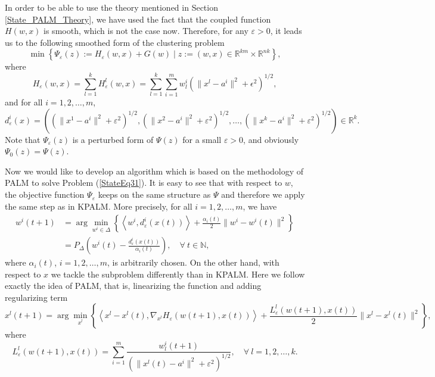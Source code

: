 \documentclass[11pt]{article}
\numberwithin{equation}{section}
\begin{document}
In order to be able to use the theory mentioned in Section \ref{State_PALM_Theory}, we have used the fact that the coupled function $H(w,x)$ is smooth, which is not the case now. Therefore, for any $\varepsilon > 0$, it leads us to the following smoothed form of the clustering problem
\begin{equation}
	\min \left\lbrace \Psi_{\varepsilon}(z) := H_{\varepsilon}(w,x) + G(w) \mid z := (w,x) \in \mathbb{R}^{km} \times \mathbb{R}^{nk} \right\rbrace , \label{StateEq31}
\end{equation}
where 
\begin{equation}
	H_{\varepsilon}(w,x) = \sum\limits_{l=1}^{k} H^l_{\varepsilon}(w,x)
	= \sum\limits_{l=1}^{k} \sum\limits_{i=1}^{m} w^i_l \left( \| x^l - a^i \|^2 + {\epsilon}^2 \right)^{1/2} , \label{StateEq34}
\end{equation}
and for all $i=1,2, \ldots, m$,
\begin{equation*}
	d_{\varepsilon}^i(x) = \left( \left( \|x^1 - a^i\|^2 + {\varepsilon}^2 \right)^{1/2}, \left( \|x^2 - a^i\|^2 + {\varepsilon}^2 \right)^{1/2}, \ldots , \left( \|x^k - a^i\|^2 + {\varepsilon}^2 \right)^{1/2} \right) \in \mathbb{R}^k .
\end{equation*}
Note that $\Psi_{\varepsilon}(z)$ is a perturbed form of $\Psi(z)$ for a small $\varepsilon > 0$, and obviously $\Psi_0(z)=\Psi(z)$.

Now we would like to develop an algorithm which is based on the methodology of PALM to solve Problem (\ref{StateEq31}). It is easy to see that with respect to $w$, the objective function $\Psi_{\varepsilon}$ keeps on the same structure as $\Psi$ and therefore we apply the same step as in KPALM. More precisely, for all $i=1,2, \ldots, m$, we have
\begin{align*}
	w^i(t+1) &= \arg\!\min\limits_{w^i \in \Delta} \left\lbrace \left\langle w^i, d^i_{\varepsilon}(x(t)) \right\rangle + \frac{\alpha_i(t)}{2} \|w^i -w^i(t)\|^2 \right\rbrace \\
	&= P_{\Delta} \left( w^i(t) - \frac{d^i_{\varepsilon}(x(t))}{\alpha_i(t)} \right), \quad \forall \: t \in \mathbb{N},
\end{align*}
where $\alpha_i(t)$, $i=1,2, \ldots, m$, is arbitrarily chosen. On the other hand, with respect to $x$ we tackle the subproblem differently than in KPALM. Here we follow exactly the idea of PALM, that is, linearizing the function and adding regularizing term
\begin{equation*}
	x^l(t+1) = \arg\!\min\limits_{x^l} \left\lbrace \left\langle x^l - x^l(t) , \nabla_{x^l}H_{\varepsilon}(w(t+1),x(t)) \right\rangle + \frac{L^l_{\varepsilon}(w(t+1),x(t))}{2} \|x^l - x^l(t)\|^2 \right\rbrace,
\end{equation*}
where 
\begin{equation*}
	L^l_{\varepsilon}(w(t+1),x(t)) = \sum\limits_{i=1}^{m} \frac{w^i_l(t+1)}{\left( \|x^l(t)-a^i\|^2 + {\varepsilon}^2 \right)^{1/2}}, \quad \forall \: l=1,2, \ldots, k.
\end{equation*}
\end{document}
